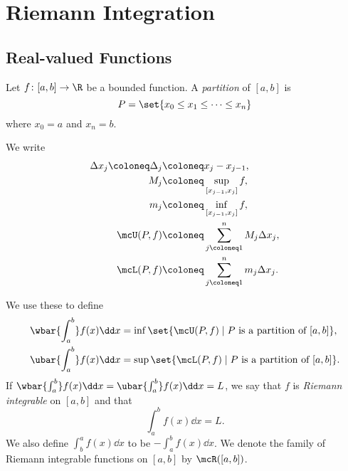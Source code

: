 \chapter{Riemann Integration} \label{chp:riemann}
\section[\R-valued Functions]{Real-valued Functions}
\begin{definition}[Partition] \label{def:partition}
    Let $f\colon [a, b] \to \R$ be a bounded function.
    A \textit{partition} of $[a, b]$ is \[
        P = \set{x_0 \le x_1 \le \cdots \le x_n}
    \] where $x_0 = a$ and $x_n = b$.

    We write \begin{align*}
        \Delta x_j \coloneq \Delta_j &\coloneq x_j - x_{j-1}, \\
        M_j   &\coloneq \sup_{[x_{j-1}, x_j]} f, \\
        m_j   &\coloneq \inf_{[x_{j-1}, x_j]} f, \\
        \mcU(P, f) &\coloneq \sum_{j\coloneq1}^n M_j \Delta x_j, \\
        \mcL(P, f) &\coloneq \sum_{j\coloneq1}^n m_j \Delta x_j.
    \end{align*}
\end{definition}

\begin{definition*} \label{def:riemann}
    We use these to define \begin{align*}
        \wbar{\int_a^b} f(x) \dd x
        &= \inf \set{\mcU(P, f) \mid P \text{ is a partition of } [a, b]}, \\
        \ubar{\int_a^b} f(x) \dd x
        &= \sup \set{\mcL(P, f) \mid P \text{ is a partition of } [a, b]}.
    \end{align*}
    If $\wbar{\int_a^b} f(x) \dd x = \ubar{\int_a^b} f(x) \dd x = L$,
    we say that $f$ is \textit{Riemann integrable} on $[a, b]$ and that \[
        \int_a^b f(x) \dd x = L.
    \] We also define $\int_b^a f(x) \dd x$ to be $-\int_a^b f(x) \dd x$.
    We denote the family of Riemann integrable functions on $[a, b]$ by
    $\mcR([a, b])$.
\end{definition*}

